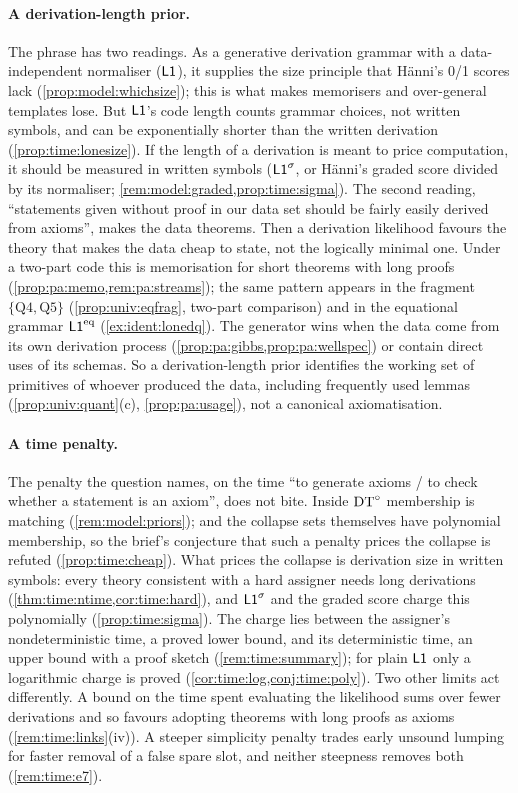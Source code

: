 \paragraph{A derivation-length prior.} The phrase has two readings. As a generative derivation grammar with a data-independent normaliser ($\mathord{\mathsf{L1}}$), it supplies the size principle that H\"anni's 0/1 scores lack (\cref{prop:model:whichsize}); this is what makes memorisers and over-general templates lose. But $\mathord{\mathsf{L1}}$'s code length counts grammar choices, not written symbols, and can be exponentially shorter than the written derivation (\cref{prop:time:lonesize}). If the length of a derivation is meant to price computation, it should be measured in written symbols ($\mathord{\mathsf{L1}}^{\sigma}$, or H\"anni's graded score divided by its normaliser; \cref{rem:model:graded,prop:time:sigma}). The second reading, ``statements given without proof in our data set should be fairly easily derived from axioms'', makes the data theorems. Then a derivation likelihood favours the theory that makes the data cheap to state, not the logically minimal one. Under a two-part code this is memorisation for short theorems with long proofs (\cref{prop:pa:memo,rem:pa:streams}); the same pattern appears in the fragment $\{\mathrm{Q4},\mathrm{Q5}\}$ (\cref{prop:univ:eqfrag}, two-part comparison) and in the equational grammar $\mathord{\mathsf{L1}}^{\mathrm{eq}}$ (\cref{ex:ident:lonedq}). The generator wins when the data come from its own derivation process (\cref{prop:pa:gibbs,prop:pa:wellspec}) or contain direct uses of its schemas. So a derivation-length prior identifies the working set of primitives of whoever produced the data, including frequently used lemmas (\cref{prop:univ:quant}(c), \cref{prop:pa:usage}), not a canonical axiomatisation.

\paragraph{A time penalty.} The penalty the question names, on the time ``to generate axioms / to check whether a statement is an axiom'', does not bite. Inside $\mathrm{DT}^{\circ}$ membership is matching (\cref{rem:model:priors}); and the collapse sets themselves have polynomial membership, so the brief's conjecture that such a penalty prices the collapse is refuted (\cref{prop:time:cheap}). What prices the collapse is derivation size in written symbols: every theory consistent with a hard assigner needs long derivations (\cref{thm:time:ntime,cor:time:hard}), and $\mathord{\mathsf{L1}}^{\sigma}$ and the graded score charge this polynomially (\cref{prop:time:sigma}). The charge lies between the assigner's nondeterministic time, a proved lower bound, and its deterministic time, an upper bound with a proof sketch (\cref{rem:time:summary}); for plain $\mathord{\mathsf{L1}}$ only a logarithmic charge is proved (\cref{cor:time:log,conj:time:poly}). Two other limits act differently. A bound on the time spent evaluating the likelihood sums over fewer derivations and so favours adopting theorems with long proofs as axioms (\cref{rem:time:links}(iv)). A steeper simplicity penalty trades early unsound lumping for faster removal of a false spare slot, and neither steepness removes both (\cref{rem:time:e7}).

